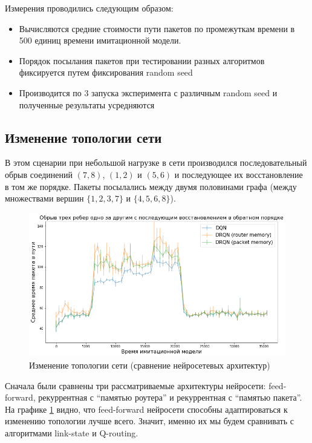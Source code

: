 \documentclass[specification, annotation]{itmo-student-thesis}
\begin{document}
Измерения проводились следующим образом:

\begin{itemize}
  \item Вычисляются средние стоимости пути пакетов по промежуткам времени в 500
    единиц времени имитационной модели.
  \item Порядок посылания пакетов при тестировании разных алгоритмов фиксируется
    путем фиксирования random seed
  \item Производится по 3 запуска эксперимента с различным random seed и
    полученные результаты усредняются
\end{itemize}

\subsection{Изменение топологии сети}\label{experiments:simple/links}

В этом сценарии при небольшой нагрузке в сети производился последовательный
обрыв соединений $(7, 8)$, $(1, 2)$ и $(5, 6)$ и последующее их восстановление в том
же порядке. Пакеты посылались между двумя половинами графа (между множествами
вершин $\{1, 2, 3, 7\}$ и $\{4, 5, 6, 8\}$).

\begin{figure}[!h]
  \caption{Изменение топологии сети (сравнение нейросетевых
    архитектур)}\label{experiment-link-failures-networks}
  \centering
  \includegraphics[scale=0.6]{experiment-link-failures-networks}
\end{figure}

Сначала были сравнены три рассматриваемые архитектуры нейросети: feed-forward,
рекуррентная с ``памятью роутера'' и рекуррентная с ``памятью пакета''. На
графике \ref{experiment-link-failures-networks} видно, что feed-forward
нейросети способны адаптироваться к изменению топологии лучше всего. Значит,
именно их мы будем сравнивать с алгоритмами link-state и Q-routing.
\end{document}
